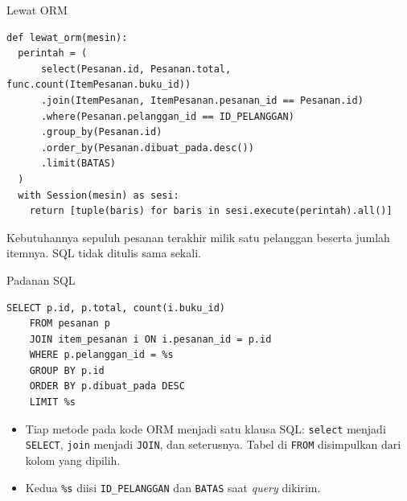 \documentclass[aspectratio=169, table, 12pt]{beamer}
\begin{document}
\begin{frame}[fragile]{{\Large Lewat ORM}}
  \vspace{2pt}
\begin{lstlisting}[style=PythonStyle]
def lewat_orm(mesin):
  perintah = (
      select(Pesanan.id, Pesanan.total, func.count(ItemPesanan.buku_id))
      .join(ItemPesanan, ItemPesanan.pesanan_id == Pesanan.id)
      .where(Pesanan.pelanggan_id == ID_PELANGGAN)
      .group_by(Pesanan.id)
      .order_by(Pesanan.dibuat_pada.desc())
      .limit(BATAS)
  )
  with Session(mesin) as sesi:
    return [tuple(baris) for baris in sesi.execute(perintah).all()]
\end{lstlisting}

  \vspace{2pt}
  {\footnotesize Kebutuhannya sepuluh pesanan terakhir milik satu pelanggan
  beserta jumlah itemnya. SQL tidak ditulis sama sekali.}
\end{frame}

\begin{frame}[fragile]{{\Large Padanan SQL}}
  \vspace{2pt}
\begin{lstlisting}[style=SqlStyle, gobble=4]
    SELECT p.id, p.total, count(i.buku_id)
    FROM pesanan p
    JOIN item_pesanan i ON i.pesanan_id = p.id
    WHERE p.pelanggan_id = %s
    GROUP BY p.id
    ORDER BY p.dibuat_pada DESC
    LIMIT %s
\end{lstlisting}

  \vspace{4pt}
  \begin{itemize}
    \item Tiap metode pada kode ORM menjadi satu klausa SQL: \texttt{select}
          menjadi \texttt{SELECT}, \texttt{join} menjadi \texttt{JOIN}, dan
          seterusnya. Tabel di \texttt{FROM} disimpulkan dari kolom yang
          dipilih.
    \item Kedua \texttt{\%s} diisi \texttt{ID\_PELANGGAN} dan \texttt{BATAS}
          saat \textit{query} dikirim.
  \end{itemize}
\end{frame}
\end{document}
